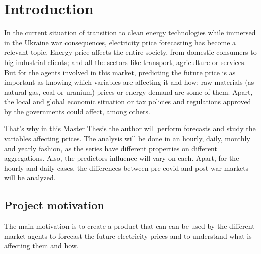 \chapter{Introduction}
%
%
In the current situation of transition to clean energy technologies while immersed in the Ukraine war consequences, electricity price forecasting has become a relevant topic. Energy price affects the entire society, from domestic consumers to big industrial clients; and all the sectors like transport, agriculture or services. But for the agents involved in this market, predicting the future price is as important as knowing which variables are affecting it and how: raw materials (as natural gas, coal or uranium) prices or energy demand are some of them. Apart, the local and global economic situation or tax policies and regulations approved by the governments could affect, among others.

That's why in this Master Thesis the author will perform forecasts and study the variables affecting prices. The analysis will be done in an hourly, daily, monthly and yearly fashion, as the series have different properties on different aggregations. Also, the predictors influence will vary on each. Apart, for the hourly and daily cases, the differences between pre-covid and post-war markets will be analyzed.


\section{Project motivation}
The main motivation is to create a product that can can be used by the different market agents to forecast the future electricity prices and to understand what is affecting them and how.

